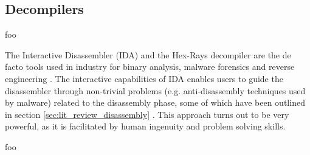 
\subsection{Decompilers}

foo

The Interactive Disassembler (IDA) and the Hex-Rays decompiler are the de facto tools used in industry for binary analysis, malware forensics and reverse engineering \cite{semantics_preserving_structural_analysis}. The interactive capabilities of IDA enables users to guide the disassembler through non-trivial problems (e.g. anti-disassembly techniques used by malware) related to the disassembly phase, some of which have been outlined in section \ref{sec:lit_review_disassembly} \cite{hexrays}. This approach turns out to be very powerful, as it is facilitated by human ingenuity and problem solving skills.


foo \cite{retargetable_decomp}
